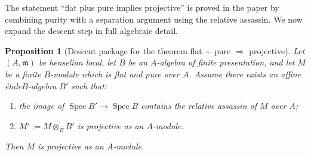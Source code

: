 \documentclass[11pt,oneside]{article}
\newtheorem{proposition}[theorem]{Proposition}
\newcommand{\Spec}{\operatorname{Spec}}
\newcommand{\etale}{\'etale}
\begin{document}
The statement ``flat plus pure implies projective'' is proved in the paper by combining purity with a separation argument using the relative assassin.  We now expand the descent step in full algebraic detail.

\begin{proposition}[Descent package for the theorem flat $+$ pure $\Rightarrow$ projective]\label{prop:projective-descent-package}
Let $(A,\mathfrak m)$ be henselian local, let $B$ be an $A$-algebra of finite presentation, and let $M$ be a finite $B$-module which is flat and pure over $A$.  Assume there exists an affine \etale $B$-algebra $B'$ such that:
\begin{enumerate}[label=\textup{(\alph*)}]
  \item the image of $\Spec B'\to \Spec B$ contains the relative assassin of $M$ over $A$;
  \item $M':=M\otimes_B B'$ is projective as an $A$-module.
\end{enumerate}
Then $M$ is projective as an $A$-module.
\end{proposition}
\end{document}
